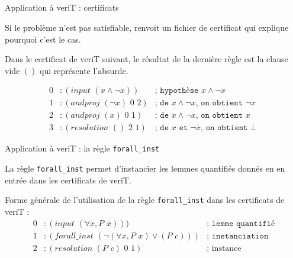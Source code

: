 \documentclass{beamer}
\begin{document}
    \subsection{}
    \begin{frame}{Application à veriT : certificats}

      Si le problème n'est pas satisfiable, renvoit un fichier de certificat qui explique pourquoi c'est le cas.

      \hspace{1cm}

      Dans le certificat de veriT suivant, le résultat de la dernière règle est la clause vide $()$ qui représente l'absurde.

      \begin{align*}
        0&:(input\,\,(x \wedge \neg x)) &\texttt{; hypothèse } x \wedge \neg x\\
        1&:(andproj \,\,(\neg x) \,\,0\,\, 2) &\texttt{; de } x \wedge \neg x \texttt{, on obtient } \neg x \\
        2&:(andproj \,\,(x)\,\, 0\,\, 1) &\texttt{; de } x \wedge \neg x \texttt{, on obtient }  x\\
        3&:(resolution \,\,() \,\,2\,\, 1) &\texttt{; de } x \texttt{ et } \neg x \texttt{, on obtient} \perp
      \end{align*}



    \end{frame}


    \begin{frame}{Application à veriT : la règle \texttt{forall\_inst}}

      La règle \texttt{forall\_inst} permet d'instancier les lemmes quantifiés donnés en en entrée dans les certificats de veriT.

      \vspace{1cm}

      Forme générale de l'utilisation de la règle \texttt{forall\_inst} dans les certificats de veriT :
      \begin{align*}
        0&:(input \,\,(\forall x, P \,\, x))) &\texttt{; lemme quantifié} \\
        1&:(forall\_inst \,\,(\neg (\forall x, P \,\, x) \vee (P \, \, c) )) &\texttt{; instanciation} \\
        2&:(resolution  \,\, (P \,\,c) \,\,0 \,\,1) & \text{; instance}
      \end{align*}

    \end{frame}
\end{document}
